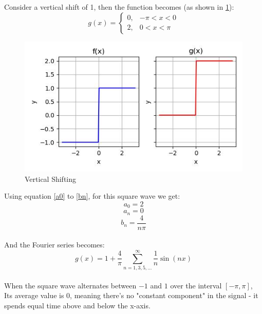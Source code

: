 \documentclass{article}
\begin{document}
Consider a vertical shift of 1, then the function becomes (as shown in \ref{fig1}):
\begin{equation}
g(x) = 
\begin{cases} 
0, & -\pi < x < 0 \\
2, & 0 < x < \pi
\end{cases}
\end{equation}

\begin{figure}
        \centering
        \includegraphics[width=\textwidth]{vertical_shift.jpg}
        \caption{Vertical Shifting}
        \label{fig1}
    \end{figure}
    
Using equation \ref{a0} to \ref{bn}, for this square wave we get:
    \begin{equation}
    a_0 = 2
    \end{equation}
    \begin{equation}
    a_n = 0
    \end{equation}
    \begin{equation}
    b_n = \frac{4}{n\pi}
    \end{equation}\\
And the Fourier series becomes:
    \begin{equation}
g(x) = 1 + \frac{4}{\pi} \sum_{n=1,3,5,...}^{\infty} \frac{1}{n} \sin\left(nx\right)
    \end{equation}\\
    
When the square wave alternates between $-1$ and $1$ over the interval $[-\pi, \pi]$, Its average value is $0$, meaning there's no "constant component" in the signal - it spends equal time above and below the x-axis.\\
\end{document}
